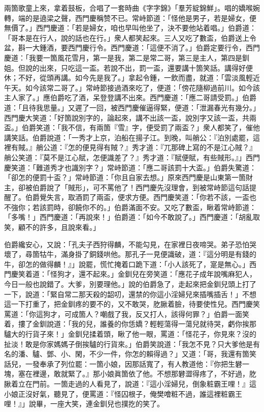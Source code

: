兩箇歌童上來，拿着鼓板，合唱了一套時曲《字字錦》「羣芳綻錦鮮」。唱的嬌喉婉轉，端的是遶梁之聲，西門慶稱赞不已。常峙節道：「怪他是男子，若是婦女，便無價了。」西門慶道：「若是婦女，咱也早叫他坐了，決不要他站着唱。」{}伯爵道：「哥本是在行人，說的話也在行。」衆人都笑起來。三人又吃了數盃，伯爵送上令盆，斟一大鍾酒，要西門慶行令。西門慶道：「這便不消了。」伯爵定要行令，西門慶道：「我要一箇風花雪月，第一是我，第二是常二哥，第三是主人，第四是釧姐。但說的出來，只吃這一盃。若說不出，罰一盃，還要講十箇笑話。講得好便休；不好，從頭再講。如今先是我了。」拿起令鍾，一飲而盡，就道：「雲淡風輕近午天。{}如今該常二哥了。」常峙節接過酒來吃了，便道：「傍花隨柳過前川。{}如今該主人家了。」應伯爵吃了酒，呆登登講不出來。西門慶道：「應二哥請受罰。」伯爵道：「且待我思量。」又遲了一回，被西門慶催逼得緊，便道：「泄漏春光有幾分。」西門慶大笑道：「好箇說別字的，論起來，講不出該一盃，說別字又該一盃，共兩盃。」伯爵笑道：「我不信，有兩箇『雪』字，便受罰了兩盃？」衆人都笑了，催他講笑話。伯爵說道：「一秀才上京，泊船在揚子江。到晚，叫艄公：『泊別處罷，這裡有賊。』艄公道：『怎的便見得有賊？』秀才道：『兀那碑上寫的不是江心賊？』艄公笑道：『莫不是江心賦，怎便識差了？』秀才道：『賦便賦，有些賊形。』」西門慶笑道：「難道秀才也識別字？」{}常峙節道：「應二哥該罰十大盃。」伯爵失驚道：「卻怎的便罰十盃？」常峙節道：「你且自家去想。」原來西門慶是山東第一箇財主，卻被伯爵說了「賊形」，可不罵他了！西門慶先沒理會，到被常峙節這句話提醒了。伯爵覺失言，取酒罰了兩盃，便求方便。西門慶笑道：「你若不該，一盃也不強你；若該罰時，卻饒你不的。」伯爵滿面不安。又吃了數盃，瞅着常峙節道：「多嘴！」{}{}西門慶道：「再說來！」伯爵道：「如今不敢說了。」西門慶道：「胡亂取笑，顧不的許多，且說來看。」

伯爵纔安心，又說：「孔夫子西狩得麟，不能勾見，在家裡日夜啼哭。弟子恐怕哭壞了，尋箇牯牛，滿身掛了銅錢哄他。那孔子一見便識破，道：『這分明是有錢的牛，卻怎的做得麟！』」說罷，慌忙掩着口跪下道：「小人該死了，寔是無心。」西門慶笑着道：「怪狗才，還不起來。」金釧兒在旁笑道：「應花子成年說嘴麻犯人，今日一般也說錯了。{}大爹，別要理他。」說的伯爵急了，走起來把金釧兒頭上打了一下，說道：「緊自常二那天殺的韶叨，還禁的你這小淫婦兒來插嘴插舌！」不想這一下打重了，把金釧疼的要不的，又不敢哭，肐䐐着臉，待要使性兒。西門慶笑罵道：「你這狗才，可成箇人？嘲戲了我，反又打人，該得何罪？」伯爵一面笑着，摟了金釧說道：「我的兒，誰養的你恁嬌？輕輕蕩得一蕩兒就待哭，虧你挨那驢大的行貨子來！」金釧兒揉着頭，瞅了他一眼，罵道：「怪花子，你見來？沒的扯淡！敢是你家媽媽子倒挨驢的行貨來。」伯爵笑說道：「我怎不見？只大爹他是有名的潘、驢、鄧、小、閑，不少一件，你怎的賴得過？」又道：「哥，我還有箇笑話兒，一發奉承了列位罷：一箇小娘，因那話寬了，有人教道他：『你把生礬一塊，塞在裡邊，敢就緊了。』那小娘眞箇依了他。不想那礬澀得疼了，不好過，肐䐐着立在門前。一箇走過的人看見了，說道：『這小淫婦兒，倒象粧霸王哩！』這小娘正沒好氣，聽見了，便罵道：『怪囚根子，俺樊噲粧不過，誰這裡粧霸王哩！』」說畢，一座大笑，連金釧兒也撲扢的笑了。

